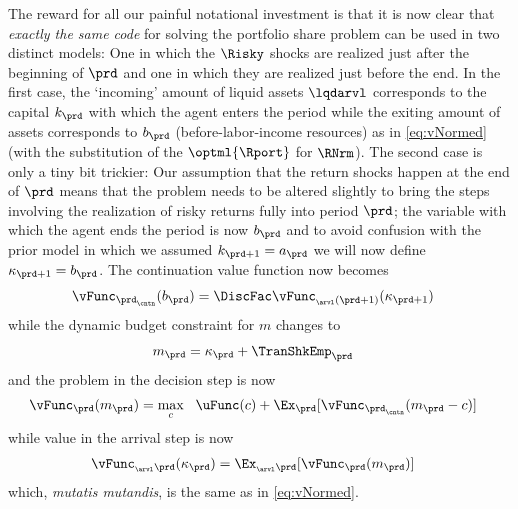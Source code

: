 \documentclass[\econtexRoot/SolvingMicroDSOPs]{subfiles}
\begin{document}
The reward for all our painful notational investment is that it is now clear that \emph{exactly the same code} for solving the portfolio share problem can be used in two distinct models: One in which the $\Risky$ shocks are realized just after the beginning of $\prd$ and one in which they are realized just before the end. In the first case, the `incoming' amount of liquid assets $\lqdarvl$ corresponds to the capital $k_{\prd}$ with which the agent enters the period while the exiting amount of assets corresponds to $b_{\prd}$ (before-labor-income resources) as in \eqref{eq:vNormed} (with the substitution of the $\optml{\Rport}$ for $\RNrm$).  The second case is only a tiny bit trickier: Our assumption that the return shocks happen at the end of $\prd$ means that the problem needs to be altered slightly to bring the steps involving the realization of risky returns fully into period $\prd$; the variable with which the agent ends the period is now ${b}_{\prd}$ and to avoid confusion with the prior model in which we assumed ${k}_{\prd+1}={a}_{\prd}$ we will now define $\kappa_{\prd+1}={b}_{\prd}$.  The continuation value function now becomes
\begin{equation}\begin{gathered}\begin{aligned}
      \vFunc_{\prd_\cntn}({{b}}_{\prd}) & = \DiscFac \vFunc_{_\arvl(\prd+1)}({\kappa}_{\prd+1})
    \end{aligned}\end{gathered}\end{equation}
while the dynamic budget constraint for ${m}$ changes to
\begin{equation}\begin{gathered}\begin{aligned}
      {m}_{\prd} & = {\kappa}_{\prd}+\TranShkEmp_{\prd}
    \end{aligned}\end{gathered}\end{equation}
and the problem in the decision step is now
\begin{equation}\begin{gathered}\begin{aligned}
      \vFunc_{\prd}({m}_{\prd}) & = \max_{{c}}~~\uFunc({c})+\Ex_{\prd}[\vFunc_{\prd_\cntn}({m}_{\prd}-{{c}})]
    \end{aligned}\end{gathered}\end{equation}
while value in the arrival step is now
\begin{equation}\begin{gathered}\begin{aligned}
      \vFunc_{_\arvl\prd}({\kappa}_{\prd}) & = \Ex_{_\arvl\prd}[\vFunc_{\prd}({m}_{\prd})]
    \end{aligned}\end{gathered}\end{equation}
which, \textit{mutatis mutandis}, is the same as in \eqref{eq:vNormed}.
\end{document}
